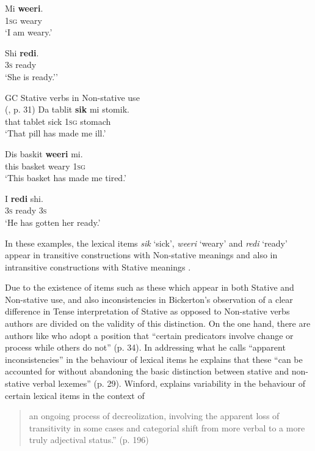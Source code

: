 \ex
\gll Mi \textbf{weeri}.\\
		\textsc{1sg} weary\\
\glt `I am weary.'

\ex
\gll Shi \textbf{redi}.\\
		\textsc{3s} ready\\
\glt `She is ready.'' \z \z

\ea%
\label{ex:3:16}
GC Stative verbs in Non-stative use \\ (\citealt{Jaganauth1987}, p. 31)
\ea
\gll Da tablit \textbf{sik} mi stomik.\\
		that tablet sick \textsc{1sg} stomach        \\
\glt `That pill has made me ill.'

\ex
\gll Dis baskit \textbf{weeri} mi.\\
          this basket weary \textsc{1sg}       \\
\glt `This basket has made me tired.'

\ex
\gll I \textbf{redi} shi.\\
     \textsc{3s} ready \textsc{3s}\\
\glt `He has gotten her ready.' \z \z

In these examples, the lexical items \textit{sik} `sick',
\textit{weeri} `weary' and \textit{redi} `ready' appear in transitive
constructions with Non-stative meanings  and also in
intransitive constructions with Stative meanings .

Due to the existence of items such as these which appear in both
Stative and Non-stative use, and also inconsistencies in Bickerton’s
observation of a clear difference in Tense interpretation of Stative
as opposed to Non-stative verbs authors are divided on the validity
of this distinction.  On the one hand, there are authors like
\citet{Winford1993} who adopt a position that “certain predicators
involve change or process while others do not” (p. 34). In addressing
what he calls “apparent inconsistencies” in the behaviour of lexical
items he explains that these “can be accounted for without abandoning
the basic distinction between stative and non-stative verbal lexemes”
(p. 29).  Winford, explains variability in the behaviour of certain
lexical items in the context of

\begin{quote}
an ongoing process of decreolization, involving the apparent loss of
transitivity in some cases and categorial shift from more verbal to a
more truly adjectival status.” (p. 196)
\end{quote}

